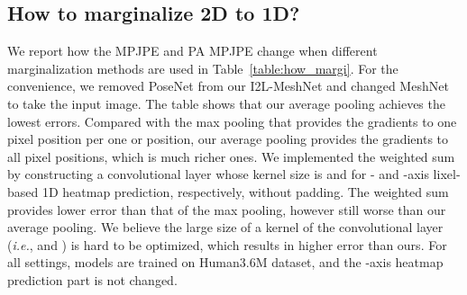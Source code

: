 \documentclass[runningheads]{llncs}
\begin{document}
\subsection{How to marginalize 2D to 1D?}
We report how the MPJPE and PA MPJPE change when different marginalization methods are used in Table~\ref{table:how_margi}.
For the convenience, we removed PoseNet from our I2L-MeshNet and changed MeshNet to take the input image.
The table shows that our average pooling achieves the lowest errors.
Compared with the max pooling that provides the gradients to one pixel position per one  or  position, our average pooling provides the gradients to all pixel positions, which is much richer ones.
We implemented the weighted sum by constructing a convolutional layer whose kernel size is  and  for - and -axis lixel-based 1D heatmap prediction, respectively, without padding.
The weighted sum provides lower error than that of the max pooling, however still worse than our average pooling.
We believe the large size of a kernel of the convolutional layer (\textit{i.e.},  and ) is hard to be optimized, which results in higher error than ours.
For all settings, models are trained on Human3.6M dataset, and the -axis heatmap prediction part is not changed.

\begin{table}
\centering
\setlength\tabcolsep{1.0pt}
\def\arraystretch{1.1}
\caption{The MPJPE and PA MPJPE comparison between various marginalization settings on Human3.6M dataset.}
\vspace*{-7mm}
\label{table:how_margi}
\end{table}
\end{document}
